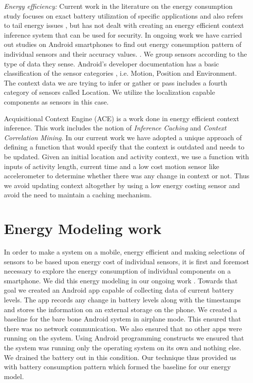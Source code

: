 \documentclass{ubicomp2013}
\begin{document}
{\em Energy efficiency:} Current work in the literature on the energy consumption study focuses on exact battery utilization of specific applications and also refers to tail energy issues \cite{pathak2011finegrainedenergy}, but has not dealt with creating an energy efficient context inference system that can be used for security.  In ongoing work we have carried out studies on Android smartphones to find out energy consumption pattern of individual
sensors and their accuracy values. \cite{das2012energy}. We group sensors according to the type of data they sense. Android's developer documentation has a basic classification of the sensor categories \cite{android2013sesnors}, i.e. Motion, Position and Environment. The context data we are trying to infer or gather or pass includes a fourth category of sensors called Location. We utilize the localization capable components as sensors in this case.

Acquisitional Context Engine (ACE) is a work done in energy efficient context inference. This work includes the notion of {\em Inference Caching} and {\em Context Correlation Mining}. In our current work we have adopted a unique approach of defining a function that would specify that the context is outdated and needs to be updated. Given an initial location and activity context, we use a function with inputs of activity length, current time and a low cost motion sensor like accelerometer to determine whether there was any change in context or not. Thus we avoid updating context altogether by using a low energy costing sensor and avoid the need to maintain a caching mechanism.

\section{Energy Modeling work}
In order to make a system on a mobile, energy efficient and making selections of sensors to be based upon energy cost of individual sensors, it is first and foremost necessary to explore the energy consumption of individual components on a smartphone. We did this energy modeling in our ongoing work \cite{das2012energy}. Towards that goal we created an Android app capable of collecting data of current battery levels. The app records any change in battery levels along with the timestamps and stores the information on an external storage on the phone. We created a baseline for the bare bone Android system in airplane mode. This ensured that there was no network communication. We also ensured that no other apps were running on the system. Using Android programming constructs we ensured that the system was running only the operating system on its own and nothing else. We drained the battery out in this condition. Our technique thus provided us with battery consumption pattern which formed the baseline for our energy model.
\end{document}
